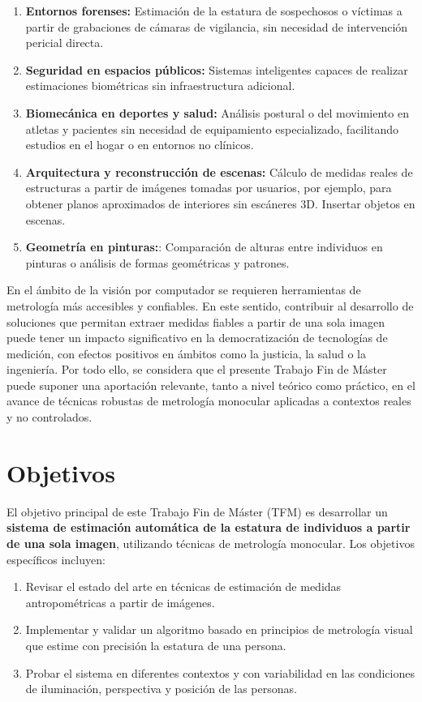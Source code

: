 \begin{enumerate}
    \item \textbf{Entornos forenses:} Estimación de la estatura de sospechosos o víctimas a partir de grabaciones de cámaras de vigilancia, sin necesidad de intervención pericial directa.
    \item \textbf{Seguridad en espacios públicos:} Sistemas inteligentes capaces de realizar estimaciones biométricas sin infraestructura adicional.
    \item \textbf{Biomecánica en deportes y salud:} Análisis postural o del movimiento en atletas y pacientes sin necesidad de equipamiento especializado, facilitando estudios en el hogar o en entornos no clínicos.
    \item \textbf{Arquitectura y reconstrucción de escenas:} Cálculo de medidas reales de estructuras a partir de imágenes tomadas por usuarios, por ejemplo, para obtener planos aproximados de interiores sin escáneres 3D. Insertar objetos en escenas.
	\item \textbf{Geometría en pinturas:}: Comparación de alturas entre individuos en pinturas o análisis de formas geométricas y patrones.
\end{enumerate}

En el ámbito de la visión por computador se requieren herramientas de metrología más accesibles y confiables. 
En este sentido, contribuir al desarrollo de soluciones que permitan extraer medidas fiables a partir de una sola imagen puede tener un impacto significativo en la democratización de tecnologías de medición, con efectos positivos en ámbitos como la justicia, la salud o la ingeniería.
Por todo ello, se considera que el presente Trabajo Fin de Máster puede suponer una aportación relevante, tanto a nivel teórico como práctico, en el avance de técnicas robustas de metrología monocular aplicadas a contextos reales y no controlados.

\section{Objetivos}
El objetivo principal de este Trabajo Fin de Máster (TFM) es desarrollar 
un \textbf{sistema de estimación automática de la estatura de individuos a partir de una sola imagen}, 
utilizando técnicas de metrología monocular. Los objetivos específicos incluyen:
\begin{enumerate}
    \item Revisar el estado del arte en técnicas de estimación de medidas antropométricas a partir de imágenes.
    \item Implementar y validar un algoritmo basado en principios de metrología visual que estime con precisión la estatura de una persona.
    \item Probar el sistema en diferentes contextos y con variabilidad en las condiciones de iluminación, perspectiva y posición de las personas.
\end{enumerate}
